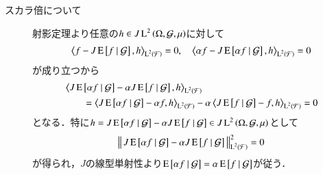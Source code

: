 \begin{prf}
\begin{description}
\begin{description}
					\item[スカラ倍について]
							射影定理より任意の$h \in J\operatorname{L}^{2} \left(\Omega, \mathcal{G},\mu\right)$に対して
							\begin{align}
								\inprod<f - J\cexp{f}{\mathcal{G}}, h>_{\Lp{2}{\mathcal{F}}} = 0, \quad \inprod<\alpha f - J\cexp{\alpha f}{\mathcal{G}}, h>_{\Lp{2}{\mathcal{F}}} = 0
							\end{align}
							が成り立つから
							\begin{align}
								&\inprod<J\cexp{\alpha f}{\mathcal{G}} - \alpha J\cexp{f}{\mathcal{G}}, h>_{\Lp{2}{\mathcal{F}}} \\
								&\qquad = \inprod<J\cexp{\alpha f}{\mathcal{G}} - \alpha f, h>_{\Lp{2}{\mathcal{F}}} - \alpha \inprod<J\cexp{f}{\mathcal{G}} - f, h>_{\Lp{2}{\mathcal{F}}}
								= 0
							\end{align}
							となる．特に$h = J\operatorname{E} \left[ \alpha f \ \middle|\ \mathcal{G} \right] - \alpha J\operatorname{E} \left[ f \ \middle|\ \mathcal{G} \right] \in J\operatorname{L}^{2} \left(\Omega, \mathcal{G},\mu\right)$として
							\begin{align}
								\left\|\, J\operatorname{E} \left[ \alpha f \ \middle|\ \mathcal{G} \right] - \alpha J\operatorname{E} \left[ f \ \middle|\ \mathcal{G} \right]\, \right\|_{\operatorname{L}^{2} \left(\mathcal{F}\right)}^2 = 0
							\end{align}
							が得られ，$J$の線型単射性より$\operatorname{E} \left[ \alpha f \ \middle|\ \mathcal{G} \right] = \alpha \operatorname{E} \left[ f \ \middle|\ \mathcal{G} \right]$が従う．
				\end{description}
				

\end{description}
\end{prf}
